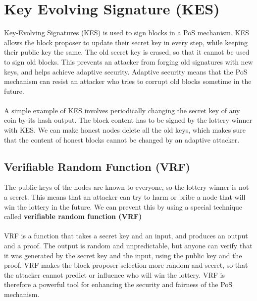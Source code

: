 \documentclass{report}
\begin{document}
\section{Key Evolving Signature (KES)}
Key-Evolving Signatures (KES) is used to sign blocks in a PoS mechanism. KES allows the block proposer to update their secret key in every step, while keeping their public key the same. The old secret key is erased, so that it cannot be used to sign old blocks. This prevents an attacker from forging old signatures with new keys, and helps achieve adaptive security. Adaptive security means that the PoS mechanism can resist an attacker who tries to corrupt old blocks sometime in the future.\\\\
A simple example of KES involves periodically changing the secret key of any coin by its hash output. The block content has to be signed by the lottery winner with KES. We can make honest nodes delete all the old keys, which makes sure that the content of honest blocks cannot be changed by an adaptive attacker.

\subsection*{Verifiable Random Function (VRF)}
The public keys of the nodes are known to everyone, so the lottery winner is not a secret. This means that an attacker can try to harm or bribe a node that will win the lottery in the future. We can prevent this by using a special technique called \textbf{verifiable random function (VRF)}\\\\
VRF is a function that takes a secret key and an input, and produces an output and a proof. The output is random and unpredictable, but anyone can verify that it was generated by the secret key and the input, using the public key and the proof.
VRF makes the block proposer selection more random and secret, so that the attacker cannot predict or influence who will win the lottery. VRF is therefore a powerful tool for enhancing the security and fairness of the PoS mechanism.
\end{document}
